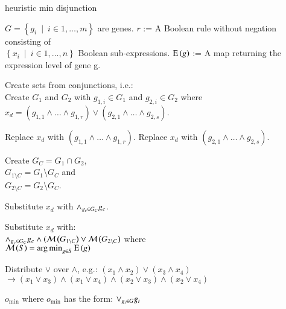 \begin{algorithm} 
\caption{heuristic min disjunction}
\label{alg:HeuristicToCNF}
\begin{algorithmic}
\INPUT $G = \left\{g_i~\mid~i \in{1, \ldots, m}\right\}$ are genes. 
\INPUT $r$ := A Boolean rule without negation consisting of\\
  $\left\{x_i~\mid~i \in{1, \ldots, n}\right\}$ Boolean sub-expressions.
\INPUT $\operatorname{E}\left(g\right)$ := A map returning the expression level of gene g.
  \State \parbox[t]{\dimexpr\linewidth-\algorithmicindent}{
    Create sets from conjunctions, i.e.:\\
    Create $G_1$ and $G_2$ with $g_{1,i} \in G_1$ 
    and $g_{2,i} \in G_2$ where\\ 
    $x_d = (g_{1,1} \land \ldots \land g_{1,r}) \lor 
    (g_{2,1} \land \ldots \land g_{2,s})$. 
    \strut}
    \State Replace $x_d$ with $(g_{1,1} \land \ldots \land g_{1,r})$.
    \State Replace $x_d$ with $(g_{2,1} \land \ldots \land g_{2,s})$.
    \Else
    \State \parbox[t]{\dimexpr\linewidth-\algorithmicindent}{
      Create $G_C = G_1 \cap G_2$, \\
      $G_{1\setminus C} = G_1 \setminus G_C$ and\\ 
      $G_{2\setminus C} = G_2 \setminus G_C$. 
      \strut}
        \State Substitute $x_d$ with $\land_{g_c \in G_C} g_c$.
      \Else
        \State \parbox[t]{\dimexpr\linewidth-\algorithmicindent}{Substitute $x_d$ with:\\
          $\land_{g_c \in G_C} g_c \land (\mathcal{M}\left(G_{1 \setminus C}\right) \lor 
          \mathcal{M}\left(G_{2\setminus C}\right)$ where\\
          $\mathcal{M}\left(S\right) = \operatorname*{arg\,min}_{g \in S}{\operatorname{E}\left(g\right)}$
          \strut}
      \EndIf
    \EndIf
  \EndIf
  \State \parbox[t]{\dimexpr\linewidth-\algorithmicindent}{
    Distribute $\lor$ over $\land$, e.g.: $(x_1 \land x_2) \lor (x_3 \land x_4)$ \\ 
    $\rightarrow (x_1 \lor x_3) \land (x_1 \lor x_4) \land 
    (x_2 \lor x_3) \land (x_2 \lor x_4)$
    \strut}
\EndWhile
\OUTPUT $o_{\min}$ where $o_{\min}$ has the form: $\lor_{g_i \in G} g_i$
\end{algorithmic} 
\end{algorithm} 
\FloatBarrier

